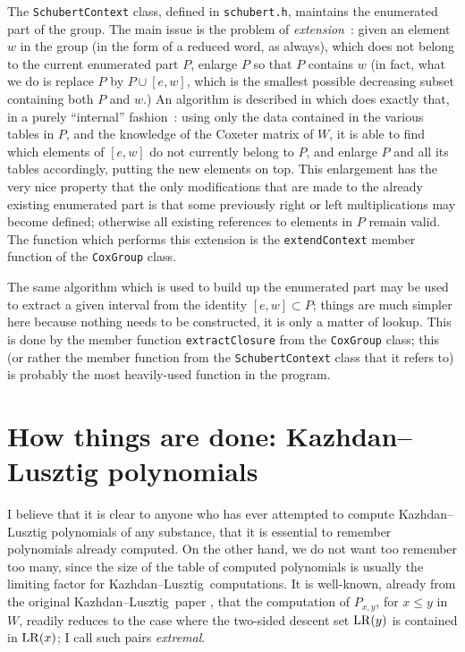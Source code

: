 \documentclass[11pt]{article}
\newcommand{\kl}{Kazh\-dan--Lusz\-tig}
\newcommand{\klpol}{Kazh\-dan--Lusz\-tig po\-ly\-no\-mial}
\newcommand{\LR}{{\rm LR}}
\begin{document}
The {\tt SchubertContext} class, defined in {\tt schubert.h}, maintains the
enumerated part of the group. The main issue is the problem of {\em
extension}~: given an element $w$ in the group (in the form of a reduced
word, as always), which does not belong to the current enumerated part $P$,
enlarge $P$ so that $P$ contains $w$ (in fact, what we do is replace $P$ by
$P\cup[e,w]$, which is the smallest possible decreasing subset containing both
$P$ and $w$.) An algorithm is described in \cite{du_cloux:2002} which does
exactly that, in a purely ``internal'' fashion~: using only the data contained
in the various tables in $P$, and the knowledge of the Coxeter matrix of $W$,
it is able to find which elements of $[e,w]$ do not currently belong to $P$,
and enlarge $P$ and all its tables accordingly, putting the new elements
on top. This enlargement has the very nice property that the only modifications
that are made to the already existing enumerated part is that some previously
right or left multiplications may become defined; otherwise all existing
references to elements in $P$ remain valid. The function which performs this
extension is the {\tt extendContext} member function of the {\tt CoxGroup}
class.

The same algorithm which is used to build up the enumerated part may be
used to extract a given interval from the identity $[e,w]\subset P$; things
are much simpler here because nothing needs to be constructed, it is only
a matter of lookup. This is done by the member function {\tt extractClosure}
from the {\tt CoxGroup} class; this (or rather the member function from the
{\tt SchubertContext} class that it refers to) is probably the most
heavily-used function in the program.

\section{How things are done: \klpol s}\label{section:klpols}

I believe that it is clear to anyone who has ever attempted to compute
\klpol s of any substance, that it is essential to remember polynomials
already computed. On the other hand, we do not want too remember too many,
since the size of the table of computed polynomials is usually the
limiting factor for \kl\ computations. It is well-known, already from
the original \kl\ paper \cite{kl:1979}, that the computation of $P_{x,y}$,
for $x\leq y$ in $W$, readily reduces to the case where the two-sided descent
set $\LR(y)$ is contained in $\LR(x)$; I call such pairs {\em extremal}.
\end{document}
